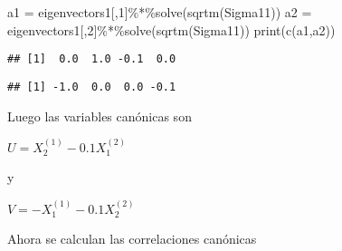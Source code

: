 \documentclass[
]{article}
\newenvironment{Shaded}{\begin{snugshade}}{\end{snugshade}}
\newcommand{\CommentTok}[1]{\textcolor[rgb]{0.56,0.35,0.01}{\textit{#1}}}
\newcommand{\DecValTok}[1]{\textcolor[rgb]{0.00,0.00,0.81}{#1}}
\newcommand{\FunctionTok}[1]{\textcolor[rgb]{0.00,0.00,0.00}{#1}}
\newcommand{\NormalTok}[1]{#1}
\newcommand{\OtherTok}[1]{\textcolor[rgb]{0.56,0.35,0.01}{#1}}
\newcommand{\SpecialCharTok}[1]{\textcolor[rgb]{0.00,0.00,0.00}{#1}}
\begin{document}
\begin{Shaded}
\begin{Highlighting}[]
\NormalTok{a1 }\OtherTok{=}\NormalTok{ eigenvectors1[,}\DecValTok{1}\NormalTok{]}\SpecialCharTok{\%*\%}\FunctionTok{solve}\NormalTok{(}\FunctionTok{sqrtm}\NormalTok{(Sigma11))}
\NormalTok{a2 }\OtherTok{=}\NormalTok{ eigenvectors1[,}\DecValTok{2}\NormalTok{]}\SpecialCharTok{\%*\%}\FunctionTok{solve}\NormalTok{(}\FunctionTok{sqrtm}\NormalTok{(Sigma11))}
\FunctionTok{print}\NormalTok{(}\FunctionTok{c}\NormalTok{(a1,a2))}
\end{Highlighting}
\end{Shaded}

\begin{verbatim}
## [1]  0.0  1.0 -0.1  0.0
\end{verbatim}

\begin{Shaded}
\end{Shaded}

\begin{verbatim}
## [1] -1.0  0.0  0.0 -0.1
\end{verbatim}

Luego las variables canónicas son

\(U = X_2^{(1)}-0.1X_1^{(2)}\)

y

\(V = -X_1^{(1)}-0.1X_2^{(2)}\)

Ahora se calculan las correlaciones canónicas
\end{document}
